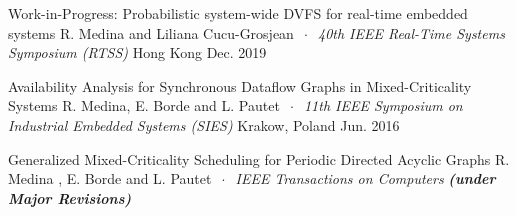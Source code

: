 \begin{cvhonors}


\cvhonor
{Work-in-Progress: Probabilistic system-wide DVFS for real-time embedded systems} 
{\newline
	R. Medina and Liliana Cucu-Grosjean $~\cdot~$ \textit{40th IEEE Real-Time 
		Systems Symposium (RTSS)} } %
{Hong Kong} %
{Dec. 2019} %


\cvhonor
{Availability Analysis for Synchronous Dataflow Graphs in Mixed-Criticality 
Systems} %
{\newline
	R. Medina, E. Borde and L. Pautet $~\cdot~$ \textit{11th IEEE 
	Symposium on Industrial Embedded Systems (SIES)}} %
{Krakow, Poland} %
{Jun. 2016} %


\end{cvhonors}



\begin{cvhonors}

\cvhonor
{Generalized Mixed-Criticality Scheduling for Periodic Directed Acyclic Graphs} 
{\newline
	R. Medina , E. Borde and L. Pautet $~\cdot~$ \textit{IEEE Transactions on Computers} 
	\textbf{\textit{(under 
	Major Revisions)}}} %
{} %
{} %
\end{cvhonors}
